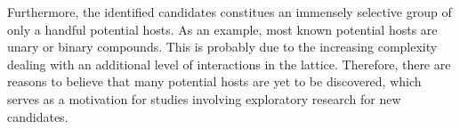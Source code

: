 Furthermore, the identified candidates constitues an immensely selective group of only a handful potential hosts. As an example, most known potential hosts are unary or binary compounds. This is probably due to the increasing complexity dealing with an additional level of interactions in the lattice. Therefore, there are reasons to believe that many potential hosts are yet to be discovered, which serves as a motivation for studies involving exploratory research for new candidates.






\clearpage
